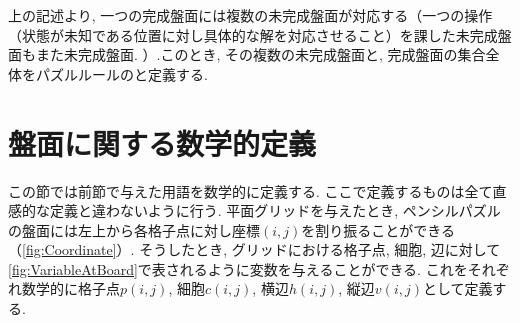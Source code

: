上の記述より, 一つの完成盤面には複数の未完成盤面が対応する（一つの操作（状態が未知である位置に対し具体的な解を対応させること）を課した未完成盤面もまた未完成盤面. ）.このとき, その複数の未完成盤面と, 完成盤面の集合全体をパズルルールのと定義する.



\section{盤面に関する数学的定義}\label{section:MathematicalDefinition}
この節では前節で与えた用語を数学的に定義する. ここで定義するものは全て直感的な定義と違わないように行う.
平面グリッドを与えたとき, ペンシルパズルの盤面には左上から各格子点に対し座標$(i,j)$を割り振ることができる（\cref{fig:Coordinate}）. そうしたとき, グリッドにおける格子点, 細胞, 辺に対して\cref{fig:VariableAtBoard}で表されるように変数を与えることができる.
これをそれぞれ数学的に格子点$p(i,j)$, 細胞$c(i,j)$, 横辺$h(i,j)$, 縦辺$v(i,j)$として定義する.


